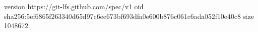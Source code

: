 version https://git-lfs.github.com/spec/v1
oid sha256:5ef6865f263340d65d97c6ee673bf693dfa0e600b876c061c6ada052f10e40c8
size 1048672
